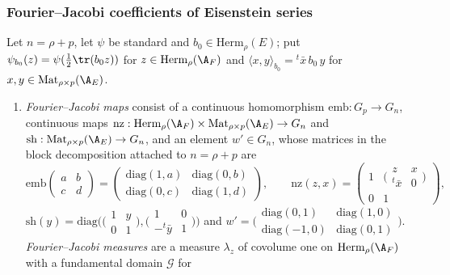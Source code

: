 \subsubsection{Fourier--Jacobi coefficients of Eisenstein series}\label{sec:pf:liftinj:fjsec}

\begin{definition}\label{pf:liftinj:fjdef}
Let $n=\rho+p$, let $\psi$ be standard and $b_0\in\mathrm{Herm}_\rho(E)$; put $\psi_{b_0}(z)=\psi(\frac12\tr(b_0z))$ for $z\in\mathrm{Herm}_\rho(\A_F)$ and
$\langle x,y\rangle_{b_0}={}^t\bar x\,b_0\,y$ for $x,y\in\mathrm{Mat}_{\rho\times p}(\A_E)$.
\begin{enumerate}[label=(\alph*)]
\item \emph{Fourier--Jacobi maps} consist of a continuous homomorphism $\mathrm{emb}:G_p\to G_n$, continuous maps
$\mathrm{nz}:\mathrm{Herm}_\rho(\A_F)\times\mathrm{Mat}_{\rho\times p}(\A_E)\to G_n$ and $\mathrm{sh}:\mathrm{Mat}_{\rho\times p}(\A_E)\to G_n$, and an
element $w'\in G_n$, whose matrices in the block decomposition attached to $n=\rho+p$ are
\[
\mathrm{emb}\begin{pmatrix}a&b\\c&d\end{pmatrix}=\begin{pmatrix}\mathrm{diag}(1,a)&\mathrm{diag}(0,b)\\\mathrm{diag}(0,c)&\mathrm{diag}(1,d)\end{pmatrix},\qquad
\mathrm{nz}(z,x)=\begin{pmatrix}1&\bigl(\begin{smallmatrix}z&x\\{}^t\bar x&0\end{smallmatrix}\bigr)\\0&1\end{pmatrix},
\]
$\mathrm{sh}(y)=\mathrm{diag}\bigl(\bigl(\begin{smallmatrix}1&y\\0&1\end{smallmatrix}\bigr),\bigl(\begin{smallmatrix}1&0\\-{}^t\bar y&1\end{smallmatrix}\bigr)\bigr)$
and $w'=\bigl(\begin{smallmatrix}\mathrm{diag}(0,1)&\mathrm{diag}(1,0)\\\mathrm{diag}(-1,0)&\mathrm{diag}(0,1)\end{smallmatrix}\bigr)$.
\emph{Fourier--Jacobi measures} are a measure $\lambda_z$ of covolume one on $\mathrm{Herm}_\rho(\A_F)$ with a fundamental domain $\mathcal G$ for

\end{enumerate}
\end{definition}
